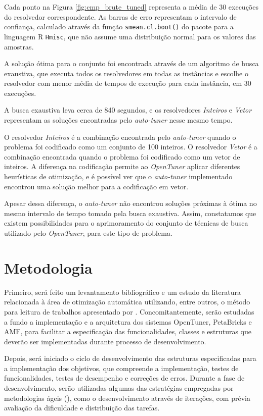 \documentclass[a4paper, 12pt]{article}
\begin{document}
Cada ponto na Figura \ref{fig:cmp_brute_tuned} representa a média de 30
execuções do resolvedor correspondente. As barras de erro representam
o intervalo de confiança, calculado através da função \texttt{smean.cl.boot()}
do pacote para a linguagem R \texttt{Hmisc}, que não assume uma distribuição
normal para os valores das amostras.

A solução ótima para o conjunto foi encontrada através de um algoritmo de busca
exaustiva, que executa todos os resolvedores em todas as instâncias e escolhe
o resolvedor com menor média de tempos de execução para cada instância, em 30
execuções.

A busca exaustiva leva cerca de 840 segundos, e os resolvedores
\textit{Inteiros} e \textit{Vetor} representam as soluções encontradas pelo
\emph{auto-tuner} nesse mesmo tempo.

O resolvedor \textit{Inteiros} é a
combinação encontrada pelo \emph{auto-tuner} quando o problema foi codificado
como um conjunto de 100 inteiros. O resolvedor \textit{Vetor} é a combinação
encontrada quando o problema foi codificado como um vetor de inteiros. A
diferença na codificação permite ao \emph{OpenTuner} aplicar diferentes
heurísticas de otimização, e é possível ver que o \emph{auto-tuner}
implementado encontrou uma solução melhor para a codificação em vetor.

Apesar dessa diferença, o \emph{auto-tuner} não encontrou soluções
próximas à ótima no mesmo intervalo de tempo tomado pela busca exaustiva.
Assim, constatamos que existem possibilidades para o aprimoramento do conjunto
de técnicas de busca utilizado pelo \emph{OpenTuner}, para este tipo 
de problema.

\section{Metodologia} \label{sec:met}

Primeiro, será feito um levantamento bibliográfico e um estudo da literatura
relacionada à área de otimização automática utilizando, entre outros, o método
para leitura de trabalhos apresentado por \citet{keshav2007howtoread}.
Concomitantemente, serão  estudadas a fundo a implementação e a arquitetura dos
sistemas OpenTuner, PetaBricks e AMF, para facilitar a especificação das
funcionalidades, classes e estruturas que deverão ser implementadas durante
processo de desenvolvimento.

Depois, será iniciado o ciclo de desenvolvimento das estruturas especificadas
para a implementação dos objetivos, que compreende a implementação,
testes de funcionalidades, testes de desempenho e correções de erros.
Durante a fase de desenvolvimento, serão utilizadas algumas das estratégias
empregadas por metodologias ágeis (\citet{beck2000extreme}), como o
desenvolvimento através de iterações, com prévia avaliação da dificuldade e
distribuição das tarefas.
\end{document}
